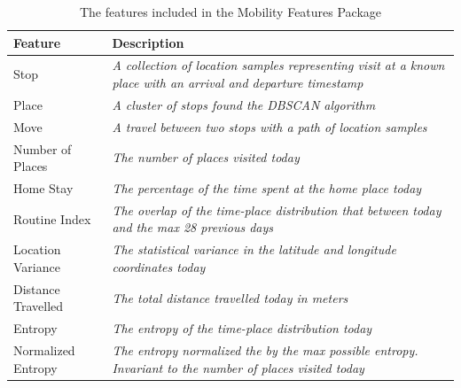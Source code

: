 \begin{table}[h]
    \centering
    \begin{tabular}{|p{}|p{}|}
    \hline
    \textbf{Feature}   & \textbf{Description}                                                                                                  \\ \hline
    Stop               & \textit{A collection of location samples representing visit at a known place with an arrival and departure timestamp} \\ \hline
    Place              & \textit{A cluster of stops found the DBSCAN algorithm}                                                                \\ \hline
    Move               & \textit{A travel between two stops with a path of location samples}                                                   \\ \hline
    Number of Places   & \textit{The number of places visited today}                                                                           \\ \hline
    Home Stay          & \textit{The percentage of the time spent at the home place today}                                                     \\ \hline
    Routine Index      & \textit{The overlap of the time-place distribution that between today and the max 28 previous days}                   \\ \hline
    Location Variance  & \textit{The statistical variance in the latitude and longitude coordinates today}                                     \\ \hline
    Distance Travelled & \textit{The total distance travelled today in meters}                                                                 \\ \hline
    Entropy            & \textit{The entropy of the time-place distribution today}                                                             \\ \hline
    Normalized Entropy & \textit{The entropy normalized the by the max possible entropy. Invariant to the number of places visited today}      \\ \hline
    \end{tabular}
    \caption{The features included in the Mobility Features Package}
    \label{tab:features-nilsson}
\end{table}


